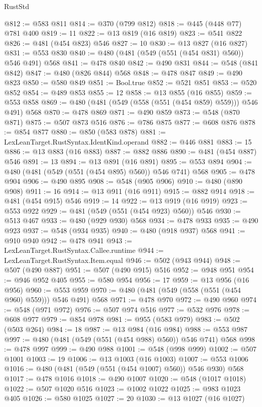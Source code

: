 \begin{lexlean}{RustStd}
\begin{coremodule}
@812 := @583 @811
@814 := @370 (@799 @812)
@818 := @445 (@448 @77) @781 @400
@819 := 11
@822 := @13 @819 (@16 @819)
@823 := @541 @822
@826 := @481 (@454 @823) @546
@827 := 10
@830 := @13 @827 (@16 @827)
@831 := @553 @830
@840 := @480 (@481 (@549 (@551 (@454 @831) @560)) @546 @491) @568
@841 := @478 @840
@842 := @490 @831
@844 := @548 (@841 @842)
@847 := @480 (@826 @844) @568
@848 := @478 @847
@849 := @490 @823
@850 := @580 @849
@851 := Bool.true
@852 := @521 @851
@853 := @520 @852
@854 := @489 @853
@855 := 12
@858 := @13 @855 (@16 @855)
@859 := @553 @858
@869 := @480 (@481 (@549 (@558 (@551 (@454 @859) @559))) @546 @491) @568
@870 := @478 @869
@871 := @490 @859
@873 := @548 (@870 @871)
@875 := @507 @873 @516
@876 := @786 @875
@877 := @608 @876
@878 := @854 @877
@880 := @850 (@583 @878)
@881 := LexLeanTarget.RustSyntax.IdentKind.operand
@882 := @446 @881
@883 := 15
@886 := @13 @883 (@16 @883)
@887 := @882 @886
@890 := @481 (@454 @887) @546
@891 := 13
@894 := @13 @891 (@16 @891)
@895 := @553 @894
@904 := @480 (@481 (@549 (@551 (@454 @895) @560)) @546 @741) @568
@905 := @478 @904
@906 := @490 @895
@908 := @548 (@905 @906)
@910 := @480 (@890 @908)
@911 := 16
@914 := @13 @911 (@16 @911)
@915 := @882 @914
@918 := @481 (@454 @915) @546
@919 := 14
@922 := @13 @919 (@16 @919)
@923 := @553 @922
@929 := @481 (@549 (@551 (@454 @923) @560)) @546
@930 := @513 @467
@933 := @480 (@929 @930) @568
@934 := @478 @933
@935 := @490 @923
@937 := @548 (@934 @935)
@940 := @480 (@918 @937) @568
@941 := @910 @940
@942 := @478 @941
@943 := LexLeanTarget.RustSyntax.Callee.runtime
@944 := LexLeanTarget.RustSyntax.Item.equal
@946 := @502 (@943 @944)
@948 := @507 (@490 @887)
@951 := @507 (@490 @915) @516
@952 := @948 @951
@954 := @946 @952 @405
@955 := @580 @954
@956 := 17
@959 := @13 @956 (@16 @956)
@960 := @553 @959
@970 := @480 (@481 (@549 (@558 (@551 (@454 @960) @559))) @546 @491) @568
@971 := @478 @970
@972 := @490 @960
@974 := @548 (@971 @972)
@976 := @507 @974 @516
@977 := @532 @976
@978 := @608 @977
@979 := @854 @978
@981 := @955 (@583 @979)
@983 := @502 (@503 @264)
@984 := 18
@987 := @13 @984 (@16 @984)
@988 := @553 @987
@997 := @480 (@481 (@549 (@551 (@454 @988) @560)) @546 @741) @568
@998 := @478 @997
@999 := @490 @988
@1001 := @548 (@998 @999)
@1002 := @507 @1001
@1003 := 19
@1006 := @13 @1003 (@16 @1003)
@1007 := @553 @1006
@1016 := @480 (@481 (@549 (@551 (@454 @1007) @560)) @546 @930) @568
@1017 := @478 @1016
@1018 := @490 @1007
@1020 := @548 (@1017 @1018)
@1022 := @507 @1020 @516
@1023 := @1002 @1022
@1025 := @983 @1023 @405
@1026 := @580 @1025
@1027 := 20
@1030 := @13 @1027 (@16 @1027)

\end{coremodule}
\end{lexlean}
